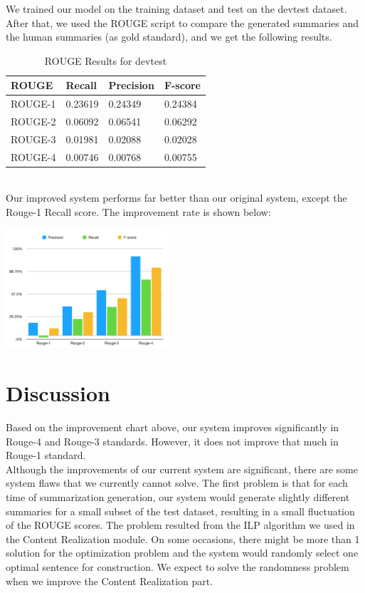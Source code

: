 \documentclass[11pt]{article}
\begin{document}
We trained our model on the training dataset and test on the devtest dataset. After that, we used the ROUGE script to compare the generated summaries and the human summaries (as gold standard), and we get the following results.
\begin{table}[ht]
\centering
\caption{ROUGE Results for devtest}
\begin{tabular}{|l|l|l|l|}
\hline
ROUGE   & Recall  & Precision & F-score \\ \hline
ROUGE-1 & 0.23619 & 0.24349   & 0.24384 \\ \hline
ROUGE-2 & 0.06092 & 0.06541   & 0.06292 \\ \hline
ROUGE-3 & 0.01981 & 0.02088   & 0.02028 \\ \hline
ROUGE-4 & 0.00746 & 0.00768   & 0.00755 \\ \hline
\end{tabular}
\end{table}\\
\indent
Our improved system performs far better than our original system, except the Rouge-1 Recall score. The improvement rate is shown below:
\begin{center}
\includegraphics[width=0.45\textwidth]{perc.png}
\end{center}

\section{Discussion}
Based on the improvement chart above, our system improves significantly in Rouge-4 and Rouge-3 standards. However, it does not improve that much in Rouge-1 standard. \\
\indent
Although the improvements of our current system are significant, there are some system flaws that we currently cannot solve. The first problem is that for each time of summarization generation, our system would generate slightly different summaries for a small subset of the test dataset, resulting in a small fluctuation of the ROUGE scores. The problem resulted from the ILP algorithm we used in the Content Realization module. On some occasions, there might be more than 1 solution for the optimization problem and the system would randomly select one optimal sentence for construction. We expect to solve the randomness problem when we improve the Content Realization part.
\end{document}
